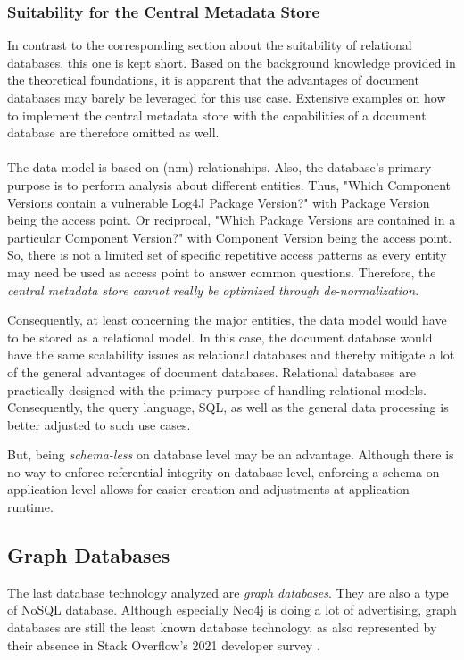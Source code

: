 \subsubsection{Suitability for the Central Metadata Store}
In contrast to the corresponding section about the suitability of relational databases, this one is kept short. Based on the background knowledge provided in the theoretical foundations, it is apparent that the advantages of document databases may barely be leveraged for this use case. Extensive examples on how to implement the central metadata store with the capabilities of a document database are therefore omitted as well.\\\\ 
The data model is based on (n:m)-relationships. Also, the database's primary purpose is to perform analysis about different entities. Thus, "Which Component Versions contain a vulnerable Log4J Package Version?" with Package Version being the access point. Or reciprocal, "Which Package Versions are contained in a particular Component Version?" with Component Version being the access point. So, there is not a limited set of specific repetitive access patterns as every entity may need be used as access point to answer common questions. Therefore, the \emph{central metadata store cannot really be optimized through de-normalization}.\par
Consequently, at least concerning the major entities, the data model would have to be stored as a relational model. In this case, the document database would have the same scalability issues as relational databases and thereby mitigate a lot of the general advantages of document databases. Relational databases are practically designed with the primary purpose of handling relational models. Consequently, the query language, SQL, as well as the general data processing is better adjusted to such use cases.\par 
But, being \emph{schema-less} on database level may be an advantage. Although there is no way to enforce referential integrity on database level, enforcing a schema on application level allows for easier creation and adjustments at application runtime.

\subsection{Graph Databases}
The last database technology analyzed are \emph{graph databases}. They are also a type of NoSQL database. Although especially Neo4j is doing a lot of advertising, graph databases are still the least known database technology, as also represented by their absence in Stack Overflow's 2021 developer survey \cite{StackoverflowDeveloperSurvey}.

